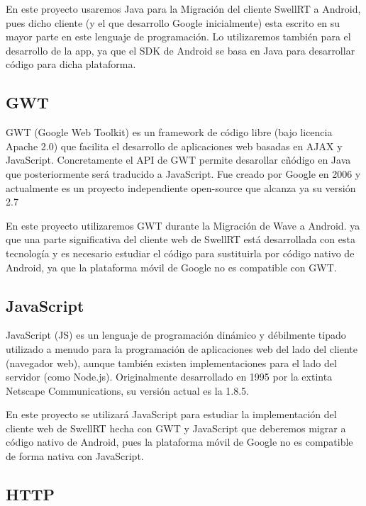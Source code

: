 	En este proyecto usaremos Java para la Migración del cliente SwellRT a Android, pues dicho cliente (y el que desarrollo Google inicialmente) esta escrito en su mayor parte en este lenguaje de programación. Lo utilizaremos también para el desarrollo de la app, ya que el SDK de Android se basa en Java para desarrollar código para dicha plataforma.
    
    \subsection{GWT}\label{ssec:gwt}
    
	GWT \cite{ref:gwt} (Google Web Toolkit) es un framework de código libre (bajo licencia Apache 2.0) que facilita el desarrollo de aplicaciones web basadas en AJAX y JavaScript. Concretamente el API de GWT permite desarollar cñódigo en Java que posteriormente será traducido a JavaScript. Fue creado por Google en 2006 y actualmente es un proyecto independiente open-source que alcanza ya su versión 2.7
	
	En este proyecto utilizaremos GWT durante la Migración de Wave a Android. ya que una parte significativa del cliente web de SwellRT está desarrollada con esta tecnología y es necesario estudiar el código para sustituirla por código nativo de Android, ya que la plataforma móvil de Google no es compatible con GWT.
    
    \subsection{JavaScript}\label{ssec:javascript}
    
	JavaScript \cite{ref:javascript} (JS) es un lenguaje de programación dinámico y débilmente tipado utilizado a menudo para la programación de aplicaciones web del lado del cliente (navegador web), aunque también existen implementaciones para el lado del servidor (como Node.js). Originalmente desarrollado en 1995 por la extinta Netscape Communications, su versión actual es la 1.8.5.  
	
	En este proyecto se utilizará JavaScript para estudiar la implementación del cliente web de SwellRT hecha con GWT y JavaScript que deberemos migrar a código nativo de Android, pues la plataforma móvil de Google no es compatible de forma nativa con JavaScript.
    
    \subsection{HTTP}\label{ssec:HTTP}
    

